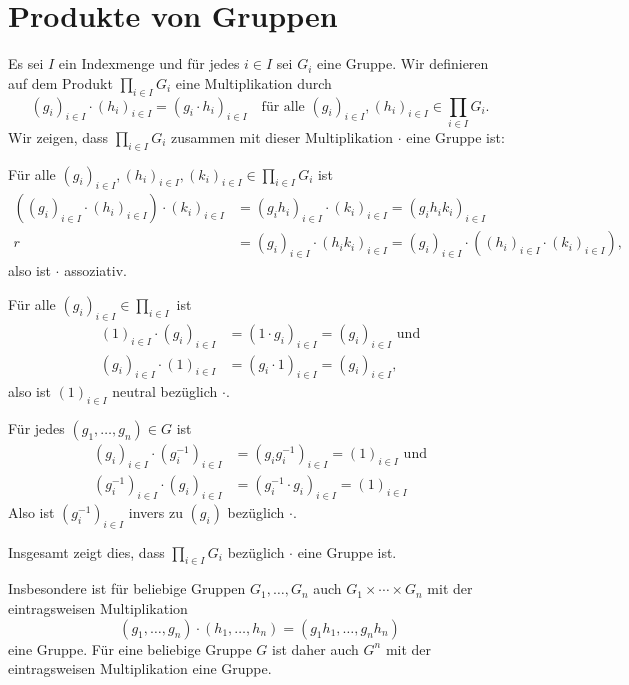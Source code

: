 \section{Produkte von Gruppen}\label{sec: product of groups}

Es sei $I$ ein Indexmenge und für jedes $i \in I$ sei $G_i$ eine Gruppe. Wir definieren auf dem Produkt $\prod_{i \in I} G_i$ eine Multiplikation durch
\[
 (g_i)_{i \in I} \cdot (h_i)_{i \in I}
 = (g_i \cdot h_i)_{i \in I}
 \quad
 \text{für alle $(g_i)_{i \in I}, (h_i)_{i \in I} \in \prod_{i \in I} G_i$}.
\]
Wir zeigen, dass $\prod_{i \in I} G_i$ zusammen mit dieser Multiplikation $\cdot$ eine Gruppe ist:

Für alle $(g_i)_{i \in I}, (h_i)_{i \in I}, (k_i)_{i \in I} \in \prod_{i \in I} G_i$ ist
\begin{align*}
 ( (g_i)_{i \in I} \cdot (h_i)_{i \in I} ) \cdot (k_i)_{i \in I}
 &= (g_i h_i)_{i \in I} \cdot (k_i)_{i \in I}
 = (g_i h_i k_i)_{i \in I} \\r
 &= (g_i)_{i \in I} \cdot (h_i k_i)_{i \in I}
 = (g_i)_{i \in I} \cdot ( (h_i)_{i \in I} \cdot (k_i)_{i \in I} ),
\end{align*}
also ist $\cdot$ assoziativ.

Für alle $(g_i)_{i \in I} \in \prod_{i \in I}$ ist
\begin{align*}
 (1)_{i \in I} \cdot (g_i)_{i \in I}
 &= (1 \cdot g_i)_{i \in I}
 = (g_i)_{i \in I}
 \text{ und} \\
 (g_i)_{i \in I} \cdot (1)_{i \in I}
 &= (g_i \cdot 1)_{i \in I}
 = (g_i)_{i \in I},
\end{align*}
also ist $(1)_{i \in I}$ neutral bezüglich $\cdot$.

Für jedes $(g_1, \dotsc, g_n) \in G$ ist
\begin{align*}
 (g_i)_{i \in I} \cdot (g_i^{-1})_{i \in I}
 &= (g_i g_i^{-1})_{i \in I}
 = (1)_{i \in I} \text{ und} \\
 (g_i^{-1})_{i \in I} \cdot (g_i)_{i \in I}
 &= (g_i^{-1} \cdot g_i)_{i \in I}
 = (1)_{i \in I}
\end{align*}
Also ist $(g_i^{-1})_{i \in I}$ invers zu $(g_i)$ bezüglich $\cdot$.

Insgesamt zeigt dies, dass $\prod_{i \in I} G_i$ bezüglich $\cdot$ eine Gruppe ist.

Insbesondere ist für beliebige Gruppen $G_1, \dotsc, G_n$ auch $G_1 \times \dotsb \times G_n$ mit der eintragsweisen Multiplikation
\[
 (g_1, \dotsc, g_n) \cdot (h_1, \dotsc, h_n) = (g_1 h_1, \dotsc, g_n h_n)
\]
eine Gruppe. Für eine beliebige Gruppe $G$ ist daher auch $G^n$ mit der eintragsweisen Multiplikation eine Gruppe.


